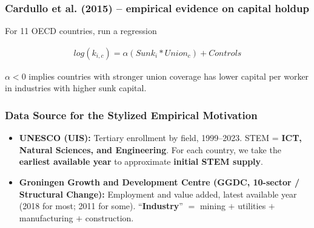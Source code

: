 \documentclass[9pt,xcolor={svgnames}]{beamer}
\begin{document}
\begin{frame}\label{app:cardullo}
\frametitle{Cardullo et al. (2015) -- empirical evidence on capital holdup}


For 11 OECD countries, run a regression 

\begin{align*}
    log (k_{i,c}) = \alpha (Sunk_i * Union_c) + Controls 
\end{align*}

$\alpha<0$ implies countries with stronger union coverage has lower capital per worker in industries with higher sunk capital. 

\hyperlink{main:summary1}{}

\end{frame}





\begin{frame}\label{app:datasource}
\frametitle{Data Source for the Stylized Empirical Motivation}
\begin{itemize}

\item \textbf{UNESCO (UIS):} Tertiary enrollment by field, 1999–2023. 
STEM = \textbf{ICT, Natural Sciences, and Engineering}.  
For each country, we take the \textbf{earliest available year} to approximate \textbf{initial STEM supply}.

\medskip

\item \textbf{Groningen Growth and Development Centre (GGDC, 10-sector / Structural Change):} 
Employment and value added, latest available year (2018 for most; 2011 for some).  
“\textbf{Industry}” $=$ mining $+$ utilities $+$ manufacturing $+$ construction.

\end{itemize}

\hyperlink{main:scatterplot}{}

\end{frame}
\end{document}
